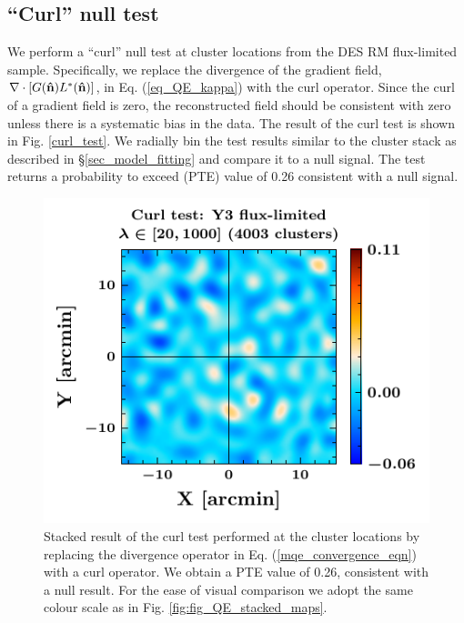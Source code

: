 \subsection{``Curl'' null test}\label{sec_null_tests}

We perform a ``curl'' null test \citep{hu07} at \howmanyclustersinfullsample{} cluster locations from the DES RM \whichyear{} flux-limited sample.
Specifically, we replace the divergence of the gradient field, $\nabla \cdot [G(\bm{\hat{\mbox{n}}}) L^{*}(\bm{\hat{\mbox{n}}})]$, in Eq. (\ref{eq_QE_kappa}) with the curl operator. 
Since the curl of a gradient field is zero, the reconstructed field should be consistent with zero unless there is a systematic bias in the data. 
The result of the curl test is shown in Fig. \ref{curl_test}. 
We radially bin the test results similar to the cluster stack as described in \S\ref{sec_model_fitting} and compare it to a null signal.
The test returns a probability to exceed (PTE) value of 0.26 consistent with a null signal.

\begin{figure}[ht]
\includegraphics[width=\linewidth]{figs/kappa_model_MF_y3_v6_4_22_full_curl_test_JODY.pdf}
\caption{Stacked result of the curl test performed at the cluster locations by replacing the divergence operator in Eq. (\ref{mqe_convergence_eqn}) with a curl operator. %
We obtain a PTE value of 0.26, consistent with a null result.
For the ease of visual comparison we adopt the same colour scale as in Fig. \ref{fig:fig_QE_stacked_maps}.
}
\end{figure}
\label{curl_test}

